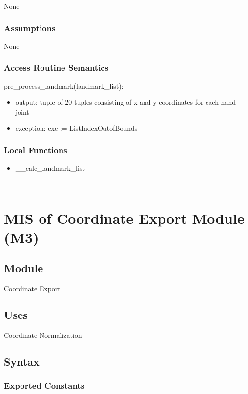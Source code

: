 \documentclass[12pt, titlepage]{article}
\begin{document}
None

\subsubsection{Assumptions}

None

\subsubsection{Access Routine Semantics}

\noindent pre\_process\_landmark(landmark\_list):
\begin{itemize}
\item output: tuple of 20 tuples consisting of x and y coordinates for each hand joint
\item exception: exc := ListIndexOutofBounds
\end{itemize}

\subsubsection{Local Functions}
\begin{itemize}
\item \_\_calc\_landmark\_list
\end{itemize}

~\newpage

\section{MIS of Coordinate Export Module (M3)} \label{m3}

\subsection{Module}

Coordinate Export

\subsection{Uses}

Coordinate Normalization

\subsection{Syntax}

\subsubsection{Exported Constants}
\end{document}
